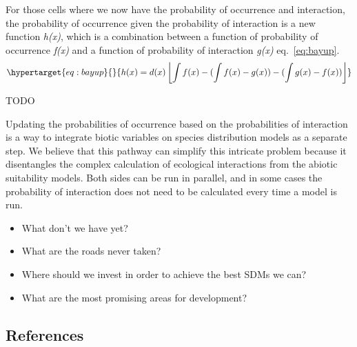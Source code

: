 \documentclass[11pt]{article}
\begin{document}
For those cells where we now have the probability of occurrence and
interaction, the probability of occurrence given the probability of
interaction is a new function \emph{h(x)}, which is a combination
between a function of probability of occurrence \emph{f(x)} and a
function of probability of interaction \emph{g(x)} eq.~\ref{eq:bayup}.\\
\begin{equation}\protect\hypertarget{eq:bayup}{}{h(x) = d(x)\left \lfloor \int f(x)-(\int f(x)-g(x))-(\int g(x)-f(x)) \right \rfloor}\label{eq:bayup}\end{equation}

TODO

Updating the probabilities of occurrence based on the probabilities of
interaction is a way to integrate biotic variables on species
distribution models as a separate step. We believe that this pathway can
simplify this intricate problem because it disentangles the complex
calculation of ecological interactions from the abiotic suitability
models. Both sides can be run in parallel, and in some cases the
probability of interaction does not need to be calculated every time a
model is run.

\begin{itemize}
\tightlist
\item
  What don't we have yet?
\item
  What are the roads never taken?
\item
  Where should we invest in order to achieve the best SDMs we can?
\item
  What are the most promising areas for development?
\end{itemize}

\hypertarget{references}{%
\subsection*{References}\label{references}}
\end{document}
